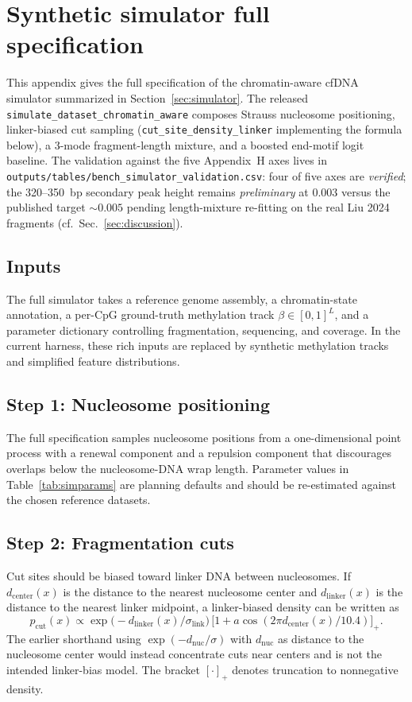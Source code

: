 \section{Synthetic simulator full specification}
\label{app:sim}

This appendix gives the full specification of the chromatin-aware cfDNA simulator summarized in Section~\ref{sec:simulator}. The released \texttt{simulate\_dataset\_chromatin\_aware} composes Strauss nucleosome positioning, linker-biased cut sampling (\texttt{cut\_site\_density\_linker} implementing the formula below), a 3-mode fragment-length mixture, and a boosted end-motif logit baseline. The validation against the five Appendix~H axes lives in \texttt{outputs/tables/bench\_simulator\_validation.csv}: four of five axes are \emph{verified}; the 320--350~bp secondary peak height remains \emph{preliminary} at $0.003$ versus the published target $\sim 0.005$ pending length-mixture re-fitting on the real Liu 2024 fragments (cf.\ Sec.~\ref{sec:discussion}).

\subsection*{Inputs}
The full simulator takes a reference genome assembly, a chromatin-state annotation, a per-CpG ground-truth methylation track $\beta\in[0,1]^L$, and a parameter dictionary controlling fragmentation, sequencing, and coverage. In the current harness, these rich inputs are replaced by synthetic methylation tracks and simplified feature distributions.

\subsection*{Step 1: Nucleosome positioning}
The full specification samples nucleosome positions from a one-dimensional point process with a renewal component and a repulsion component that discourages overlaps below the nucleosome-DNA wrap length. Parameter values in Table~\ref{tab:simparams} are planning defaults and should be re-estimated against the chosen reference datasets.

\subsection*{Step 2: Fragmentation cuts}
Cut sites should be biased toward linker DNA between nucleosomes. If $d_{\mathrm{center}}(x)$ is the distance to the nearest nucleosome center and $d_{\mathrm{linker}}(x)$ is the distance to the nearest linker midpoint, a linker-biased density can be written as
\begin{equation}
p_{\mathrm{cut}}(x) \propto \exp\!\big(-d_{\mathrm{linker}}(x)/\sigma_{\mathrm{link}}\big)\,\big[1 + a\cos(2\pi d_{\mathrm{center}}(x)/10.4)\big]_+.
\end{equation}
The earlier shorthand using $\exp(-d_{\mathrm{nuc}}/\sigma)$ with $d_{\mathrm{nuc}}$ as distance to the nucleosome center would instead concentrate cuts near centers and is not the intended linker-bias model. The bracket $[\cdot]_+$ denotes truncation to nonnegative density.


